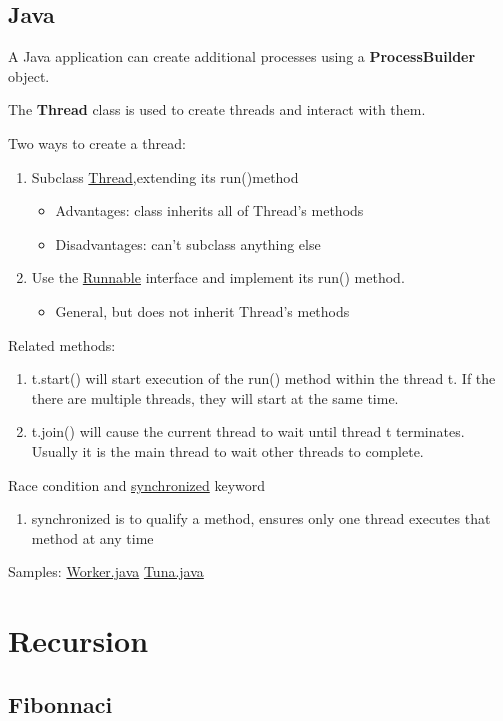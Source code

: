 \documentclass[12pt, a4paper]{report}
\begin{document}
    \subsection{Java}
    A Java application can create additional processes using a \textbf{ProcessBuilder} object. \par
    The \textbf{Thread} class is used to create threads and interact with them. \par
    Two ways to create a thread: \citep{thread} 
    \begin{enumerate}
        \item Subclass \underline{Thread},extending its run()method
        \begin{itemize}
            \item Advantages: class inherits all of Thread’s methods
            \item Disadvantages: can’t subclass anything else
        \end{itemize}
        \item Use the \underline{Runnable} interface and implement its run() method.
        \begin{itemize}
            \item General, but does not inherit Thread’s methods
        \end{itemize}
    \end{enumerate}
    Related methods:
    \begin{enumerate}
        \item t.start() will start execution of the run() method within the
thread t. If the there are multiple threads, they will start at the same time.
        \item t.join() will cause the current thread to wait until thread t
terminates. Usually it is the main thread to wait other threads to complete. 
    \end{enumerate}
    Race condition and \underline{synchronized} keyword
    \begin{enumerate}
        \item synchronized is to qualify a method, ensures only one thread executes that method at any time
    \end{enumerate}
    Samples:
    \url{Worker.java}
    \url{Tuna.java}
    

\section{Recursion}
    \subsection{Fibonnaci}
\end{document}

